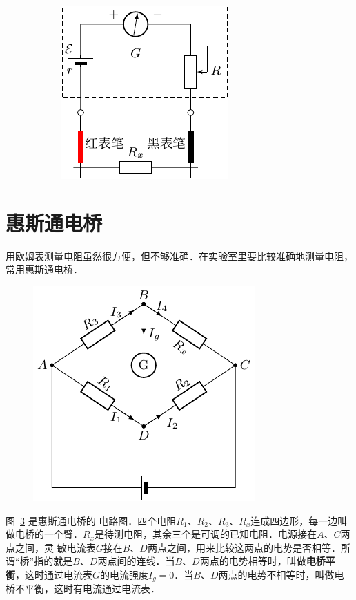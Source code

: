 \begin{figure}[htbp]
    \hfil
    \begin{subfigure}{0.3\linewidth}
        \centering
        \includegraphics{fig/B/7-38c.pdf}
        \caption{}\label{fig_B_7-38c}
    \end{subfigure}
    \caption{}\label{fig_B_7-38}
\end{figure}

\section{惠斯通电桥}
用欧姆表测量电阻虽然很方便，但不够准确．在实验室里要比较准确地测量电阻，常用惠斯通电桥．

\begin{figure}[htbp]
    \centering
    \includegraphics{fig/B/7-39.pdf}
    \caption{}\label{fig_B_7-39}
\end{figure}

图~\ref{fig_B_7-39} 是惠斯通电桥的
电路图．四个电阻$R_1$、$R_2$、$R_3$、$R_x$连成四边形，每一边叫做电桥的一个臂．$R_x$是待测电阻，其余三个是可调的已知电阻．电源接在$A$、$C$两点之间，灵
敏电流表$G$接在$B$、$D$两点之间，用来比较这两点的电势是否相等．所谓“桥”指的就是$B$、$D$两点间的连线．当$B$、$D$两点的电势相等时，叫做\textbf{电桥平衡}，这时通过电流表$G$的电流强度$I_g=0$．当$B$、$D$两点的电势不相等时，叫做电桥不平衡，这时有电流通过电流表．

